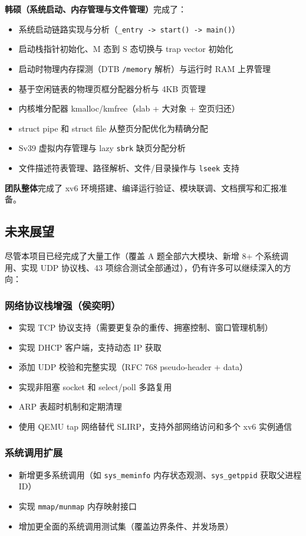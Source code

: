 \documentclass[12pt,a4paper]{ctexart}
\begin{document}
\textbf{韩硕（系统启动、内存管理与文件管理）}完成了：
\begin{itemize}
  \item 系统启动链路实现与分析（\texttt{\_entry -> start() -> main()}）
  \item 启动栈指针初始化、M 态到 S 态切换与 trap vector 初始化
  \item 启动时物理内存探测（DTB \texttt{/memory} 解析）与运行时 RAM 上界管理
  \item 基于空闲链表的物理页框分配器分析与 4KB 页管理
  \item 内核堆分配器 kmalloc/kmfree（slab + 大对象 + 空页归还）
  \item struct pipe 和 struct file 从整页分配优化为精确分配
  \item Sv39 虚拟内存管理与 lazy \texttt{sbrk} 缺页分配分析
  \item 文件描述符表管理、路径解析、文件/目录操作与 \texttt{lseek} 支持
\end{itemize}

\textbf{团队整体}完成了 xv6 环境搭建、编译运行验证、模块联调、文档撰写和汇报准备。

\subsection{未来展望}

尽管本项目已经完成了大量工作（覆盖 A 题全部六大模块、新增 8+ 个系统调用、实现 UDP 协议栈、43 项综合测试全部通过），仍有许多可以继续深入的方向：

\subsubsection{网络协议栈增强（侯奕明）}
\begin{itemize}
  \item 实现 TCP 协议支持（需要更复杂的重传、拥塞控制、窗口管理机制）
  \item 实现 DHCP 客户端，支持动态 IP 获取
  \item 添加 UDP 校验和完整实现（RFC 768 pseudo-header + data）
  \item 实现非阻塞 socket 和 select/poll 多路复用
  \item ARP 表超时机制和定期清理
  \item 使用 QEMU tap 网络替代 SLIRP，支持外部网络访问和多个 xv6 实例通信
\end{itemize}

\subsubsection{系统调用扩展}
\begin{itemize}
  \item 新增更多系统调用（如 \texttt{sys\_meminfo} 内存状态观测、\texttt{sys\_getppid} 获取父进程 ID）
  \item 实现 \texttt{mmap/munmap} 内存映射接口
  \item 增加更全面的系统调用测试集（覆盖边界条件、并发场景）
\end{itemize}
\end{document}
